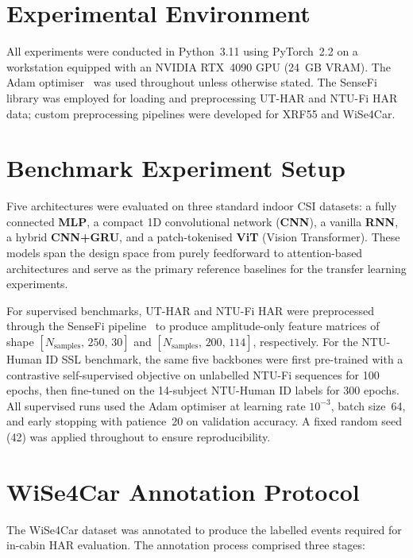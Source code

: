 \documentclass[english,bibtex]{kththesis}
\begin{document}
\section{Experimental Environment}
\label{sec:expenv}

All experiments were conducted in Python~3.11 using PyTorch~2.2 on a workstation equipped with an NVIDIA RTX~4090 GPU (24~GB VRAM). The Adam optimiser~\cite{kingma2015adam} was used throughout unless otherwise stated. The SenseFi~\cite{yang2023sensefi} library was employed for loading and preprocessing UT-HAR and NTU-Fi HAR data; custom preprocessing pipelines were developed for XRF55 and WiSe4Car.

\section{Benchmark Experiment Setup}
\label{sec:benchmark}

Five architectures were evaluated on three standard indoor CSI datasets: a fully connected \textbf{MLP}, a compact 1D convolutional network (\textbf{CNN}), a vanilla \textbf{RNN}, a hybrid \textbf{CNN+GRU}, and a patch-tokenised \textbf{ViT} (Vision Transformer). These models span the design space from purely feedforward to attention-based architectures and serve as the primary reference baselines for the transfer learning experiments.

For supervised benchmarks, UT-HAR and NTU-Fi HAR were preprocessed through the SenseFi pipeline~\cite{yang2023sensefi} to produce amplitude-only feature matrices of shape $[N_{\text{samples}},\,250,\,30]$ and $[N_{\text{samples}},\,200,\,114]$, respectively. For the NTU-Human ID SSL benchmark, the same five backbones were first pre-trained with a contrastive self-supervised objective on unlabelled NTU-Fi sequences for 100 epochs, then fine-tuned on the 14-subject NTU-Human ID labels for 300 epochs. All supervised runs used the Adam optimiser at learning rate $10^{-3}$, batch size~64, and early stopping with patience~20 on validation accuracy. A fixed random seed (42) was applied throughout to ensure reproducibility.

\section{WiSe4Car Annotation Protocol}
\label{sec:annotation_protocol}

The WiSe4Car dataset was annotated to produce the labelled events required for in-cabin HAR evaluation. The annotation process comprised three stages:
\end{document}
